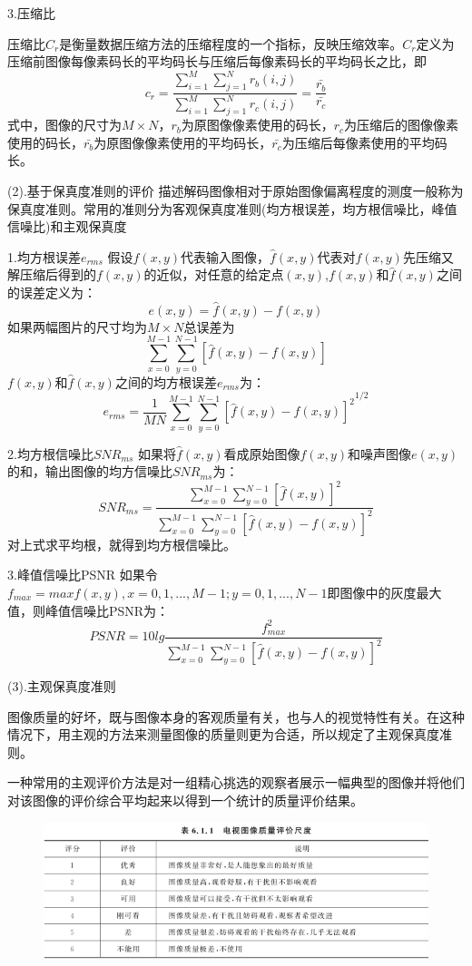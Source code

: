 \documentclass[11pt]{article}
\begin{document}
3.压缩比

压缩比$C_r$是衡量数据压缩方法的压缩程度的一个指标，反映压缩效率。$C_r$定义为压缩前图像每像素码长的平均码长与压缩后每像素码长的平均码长之比，即
$$c_r = \frac{\sum_{i=1}^{M}\sum_{j=1}^{N}r_b(i,j)}{\sum_{i=1}^{M}\sum_{j=1}^{N}r_c(i,j)} = \frac{\bar{r_b}}{\bar{r_c}}$$
式中，图像的尺寸为$M\times N$，$r_b$为原图像像素使用的码长，$r_c$为压缩后的图像像素使用的码长，$\bar{r_b}$为原图像像素使用的平均码长，$\bar{r_c}$为压缩后每像素使用的平均码长。 

(2).基于保真度准则的评价
描述解码图像相对于原始图像偏离程度的测度一般称为保真度准则。常用的准则分为客观保真度准则(均方根误差，均方根信噪比，峰值信噪比)和主观保真度

1.均方根误差$e_{rms}$
假设$f(x,y)$代表输入图像，$\hat{f}(x,y)$代表对$f(x,y)$先压缩又解压缩后得到的$f(x,y)$的近似，对任意的给定点$(x,y)$,$f(x,y)$和$\hat{f}(x,y)$之间的误差定义为：
$$e(x,y) = \hat{f}(x,y) - f(x,y)$$
如果两幅图片的尺寸均为$M\times N$总误差为
$$\sum_{x=0}^{M-1}\sum_{y=0}^{N-1}[\hat{f}(x,y) - f(x,y)]$$
$f(x,y)$和$\hat{f}(x,y)$之间的均方根误差$e_{rms}$为：
$$e_{rms} = {\frac{1}{MN}\sum_{x=0}^{M-1}\sum_{y=0}^{N-1}[\hat{f}(x,y) - f(x,y)]^2}^{1/2}$$

2.均方根信噪比$SNR_{ms}$
如果将$\hat{f}(x,y)$看成原始图像$f(x,y)$和噪声图像$e(x,y)$的和，输出图像的均方信噪比$SNR_{ms}$为：
$$SNR_{ms} = \frac{\sum_{x=0}^{M-1}\sum_{y=0}^{N-1}[\hat{f}(x,y)]^2}{\sum_{x=0}^{M-1}\sum_{y=0}^{N-1}[\hat{f}(x,y) - f(x,y)]^2}$$
对上式求平均根，就得到均方根信噪比。

3.峰值信噪比PSNR
如果令$f_{max} = max{f(x,y), x=0,1,...,M-1;y=0,1,...,N-1}$即图像中的灰度最大值，则峰值信噪比PSNR为：
$$PSNR = 10lg{\frac{f^2_{max}}{\sum_{x=0}^{M-1}\sum_{y=0}^{N-1}[\hat{f}(x,y) - f(x,y)]^2}}$$

(3).主观保真度准则

图像质量的好坏，既与图像本身的客观质量有关，也与人的视觉特性有关。在这种情况下，用主观的方法来测量图像的质量则更为合适，所以规定了主观保真度准则。

一种常用的主观评价方法是对一组精心挑选的观察者展示一幅典型的图像并将他们对该图像的评价综合平均起来以得到一个统计的质量评价结果。

\begin{figure}[H]
	\centering
	\includegraphics[scale=0.7]{37}
\end{figure}
\end{document}
